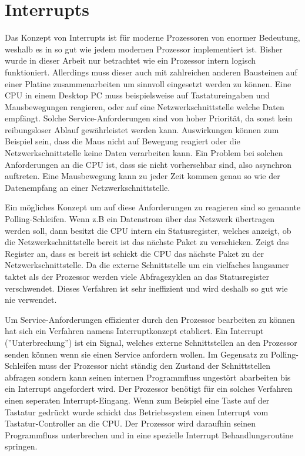 \documentclass[12pt]{article}
\begin{document}
\section{Interrupts}
Das Konzept von Interrupts ist für moderne Prozessoren von enormer Bedeutung, weshalb es in so gut wie jedem modernen Prozessor implementiert ist. Bisher wurde in dieser Arbeit nur betrachtet wie ein Prozessor intern logisch funktioniert. Allerdings muss dieser auch mit zahlreichen anderen Bausteinen auf einer Platine zusammenarbeiten um sinnvoll eingesetzt werden zu können. Eine CPU in einem Desktop PC muss beispielsweise auf Tastatureingaben und Mausbewegungen reagieren, oder auf eine Netzwerkschnittstelle welche Daten empfängt. Solche Service-Anforderungen sind von hoher Priorität, da sonst kein reibungsloser Ablauf gewährleistet werden kann. Auswirkungen können zum Beispiel sein, dass die Maus nicht auf Bewegung reagiert oder die Netzwerkschnittstelle keine Daten verarbeiten kann. Ein Problem bei solchen Anforderungen an die CPU ist, dass sie nicht vorhersehbar sind, also asynchron auftreten. Eine Mausbewegung kann zu jeder Zeit kommen genau so wie der Datenempfang an einer Netzwerkschnittstelle.
\par
\noindent Ein mögliches Konzept um auf diese Anforderungen zu reagieren sind so genannte Polling-Schleifen. Wenn z.B ein Datenstrom über das Netzwerk übertragen werden soll, dann besitzt die CPU intern ein Statusregister, welches anzeigt, ob die Netzwerkschnittstelle bereit ist das nächste Paket zu verschicken. Zeigt das Register an, dass es bereit ist schickt die CPU das nächste Paket zu der Netzwerkschnittstelle. Da die externe Schnittstelle um ein vielfaches langsamer taktet als der Prozessor werden viele Abfragezyklen an das Statusregister verschwendet. Dieses Verfahren ist sehr ineffizient und wird deshalb so gut wie nie verwendet. \cite{mikroprozessortechnik2011}
\par 
\noindent Um Service-Anforderungen effizienter durch den Prozessor bearbeiten zu können hat sich ein Verfahren namens Interruptkonzept etabliert. Ein Interrupt (''Unterbrechung'') ist ein Signal, welches externe Schnittstellen an den Prozessor senden können wenn sie einen Service anfordern wollen. Im Gegensatz zu Polling-Schleifen muss der Prozessor nicht ständig den Zustand der Schnittstellen abfragen sondern kann seinen internen Programmfluss ungestört abarbeiten bis ein Interrupt angefordert wird. Der Prozessor benötigt für ein solches Verfahren einen seperaten Interrupt-Eingang. Wenn zum Beispiel eine Taste auf der Tastatur gedrückt wurde schickt das Betriebssystem einen Interrupt vom Tastatur-Controller an die CPU. Der Prozessor wird daraufhin seinen Programmfluss unterbrechen und in eine spezielle Interrupt Behandlungsroutine springen.
\end{document}
